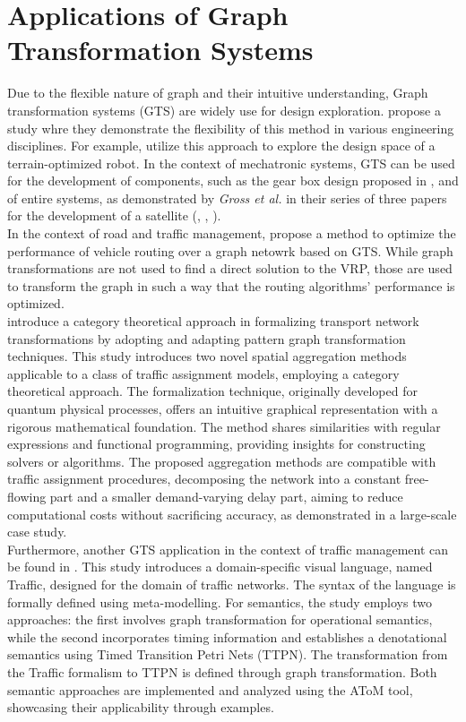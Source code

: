 \section{Applications of Graph Transformation Systems }\label{sec:app_gts}
Due to the flexible nature of graph and their intuitive understanding, Graph transformation systems (GTS) are widely use for design exploration.  propose a study whre they demonstrate the flexibility of this method in various engineering disciplines. For example,  utilize this approach to explore the design space of a terrain-optimized robot. In the context of mechatronic systems, GTS can be used for the development of components, such as the gear box design proposed in , and of entire systems, as demonstrated by \textit{Gross et al.} in their series of three papers for the development of a satellite (\cite{gross2016a}, \cite{gross2016b}, \cite{gross2016c}). \\
In the context of road and traffic management,  propose a method to optimize the performance of vehicle routing over a graph netowrk based on GTS. While graph transformations are not used to find a direct solution to the VRP, those are used to transform the graph in such a way that the routing algorithms' performance is optimized. \\
introduce a category theoretical approach in formalizing transport network transformations by adopting and adapting pattern
graph transformation techniques. This study introduces two novel spatial aggregation methods applicable to a class of traffic assignment models, employing a category theoretical approach. The formalization technique, originally developed for quantum physical processes, offers an intuitive graphical representation with a rigorous mathematical foundation. The method shares similarities with regular expressions and functional programming, providing insights for constructing solvers or algorithms. The proposed aggregation methods are compatible with traffic assignment procedures, decomposing the network into a constant free-flowing part and a smaller demand-varying delay part, aiming to reduce computational costs without sacrificing accuracy, as demonstrated in a large-scale case study.\\
Furthermore, another GTS application in the context of traffic management can be found in . This study introduces a domain-specific visual language, named Traffic, designed for the domain of traffic networks. The syntax of the language is formally defined using meta-modelling. For semantics, the study employs two approaches: the first involves graph transformation for operational semantics, while the second incorporates timing information and establishes a denotational semantics using Timed Transition Petri Nets (TTPN). The transformation from the Traffic formalism to TTPN is defined through graph transformation. Both semantic approaches are implemented and analyzed using the AToM tool, showcasing their applicability through examples.

 

